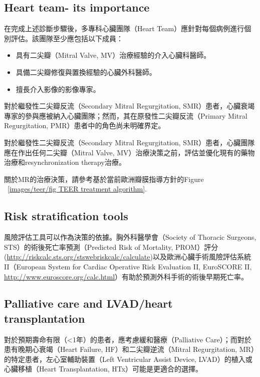 \documentclass[nols]{tufte-book}
\begin{document}
\subsection{Heart team- its importance}
在完成上述診斷步驟後，多專科心臟團隊（Heart Team）應針對每個病例進行個別評估。該團隊至少應包括以下成員：\cite{Ibrahim2023}

\begin{itemize}
    \item 具有二尖瓣（Mitral Valve, MV）治療經驗的介入心臟科醫師。
    \item 具備二尖瓣修復與置換經驗的心臟外科醫師。
    \item 擅長介入影像的影像專家。
\end{itemize}

對於繼發性二尖瓣反流（Secondary Mitral Regurgitation, SMR）患者，心臟衰竭專家的參與應被納入心臟團隊；然而，其在原發性二尖瓣反流（Primary Mitral Regurgitation, PMR）患者中的角色尚未明確界定。

對於繼發性二尖瓣反流（Secondary Mitral Regurgitation, SMR）患者，心臟團隊應在作出任何二尖瓣（Mitral Valve, MV）治療決策之前，評估並優化現有的藥物治療和resynchronization therapy治療。

關於MR的治療決策，請參考基於當前歐洲瓣膜指導方針的Figure ~\ref{images/teer/fig TEER treatment algorithm}. 

\subsection{Risk stratification tools}
風險評估工具可以作為決策的依據。胸外科醫學會（Society of Thoracic Surgeons, STS）的術後死亡率預測（Predicted Risk of Mortality, PROM）評分(\href{http://riskcalc.sts.org/stswebriskcalc/calculate}{http://riskcalc.sts.org/stswebriskcalc/calculate})以及歐洲心臟手術風險評估系統 II（European System for Cardiac Operative Risk Evaluation II, EuroSCORE II, \href{http://www.euroscore.org/calc.html}{http://www.euroscore.org/calc.html}）有助於預測外科手術的術後早期死亡率。

\subsection{Palliative care and LVAD/heart transplantation}
對於預期壽命有限（<1年）的患者，應考慮緩和醫療（Palliative Care）；而對於患有晚期心衰竭（Heart Failure, HF）和二尖瓣逆流（Mitral Regurgitation, MR）的特定患者，左心室輔助裝置（Left Ventricular Assist Device, LVAD）的植入或心臟移植（Heart Transplantation, HTx）可能是更適合的選擇。
\end{document}
